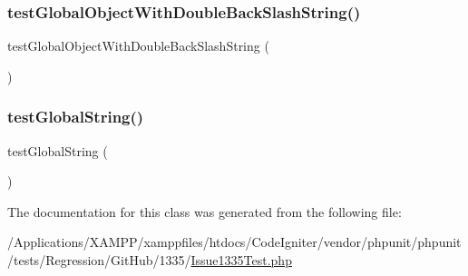 \mbox{\label{class_issue1335_test_a6e899264f5544c6099ee26812fdf5b1e}} 
\subsubsection{\texorpdfstring{test\+Global\+Object\+With\+Double\+Back\+Slash\+String()}{testGlobalObjectWithDoubleBackSlashString()}}
{\footnotesize\ttfamily test\+Global\+Object\+With\+Double\+Back\+Slash\+String (\begin{DoxyParamCaption}{ }\end{DoxyParamCaption})}

\mbox{\label{class_issue1335_test_a190e90c36bcc3f13c1b2b97f00950e88}} 
\subsubsection{\texorpdfstring{test\+Global\+String()}{testGlobalString()}}
{\footnotesize\ttfamily test\+Global\+String (\begin{DoxyParamCaption}{ }\end{DoxyParamCaption})}



The documentation for this class was generated from the following file\+:\begin{DoxyCompactItemize}
\item 
/\+Applications/\+X\+A\+M\+P\+P/xamppfiles/htdocs/\+Code\+Igniter/vendor/phpunit/phpunit/tests/\+Regression/\+Git\+Hub/1335/\mbox{\hyperlink{_issue1335_test_8php}{Issue1335\+Test.\+php}}\end{DoxyCompactItemize}
